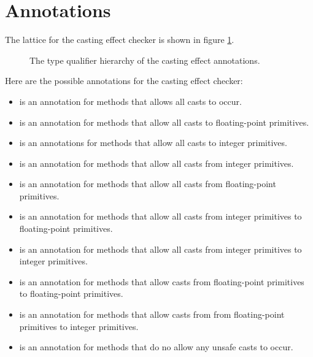 \section{Annotations\label{castingeffect-checker-annotations}}

The lattice for the casting effect checker is shown in figure \ref{fig-casting-hierarchy}.
\begin{figure}
\caption{The type qualifier hierarchy of the casting effect annotations.}
\label{fig-casting-hierarchy}
\end{figure}

\noindent
Here are the possible annotations for the casting effect checker:
\begin{itemize}
\item
{} is an annotation for methods that allows all casts to occur.
\item
{} is an annotation for methods that allow all casts to floating-point primitives.
\item
{} is an annotations for methods that allow all casts to integer primitives.
\item
{} is an annotation for methods that allow all casts from integer primitives.
\item
{} is an annotation for methods that allow all casts from floating-point primitives.
\item
{} is an annotation for methods that allow all casts from integer primitives to floating-point primitives.
\item
{} is an annotation for methods that allow all casts from integer primitives to integer primitives.
\item
{} is an annotation for methods that allow casts from floating-point primitives to floating-point primitives.
\item
{} is an annotation for methods that allow casts from from floating-point primitives to integer primitives.
\item
{} is an annotation for methods that do no allow any unsafe casts to occur.
\end{itemize}


